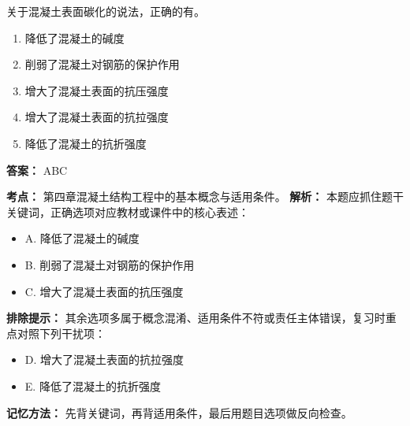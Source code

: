 \documentclass[UTF8,fontset=fandol,11pt]{ctexart}
\begin{document}
\begin{quizbox}[title={第 65 题}]
关于混凝土表面碳化的说法，正确的有。\\
\begin{enumerate}[label=\Alph*.]
\item 降低了混凝土的碱度
\item 削弱了混凝土对钢筋的保护作用
\item 增大了混凝土表面的抗压强度
\item 增大了混凝土表面的抗拉强度
\item 降低了混凝土的抗折强度
\end{enumerate}
\textbf{答案：} ABC
\vspace{0.25em}
\begin{answerbox}[title={考点解析}]
\textbf{考点：} 第四章混凝土结构工程中的基本概念与适用条件。
\textbf{解析：} 本题应抓住题干关键词，正确选项对应教材或课件中的核心表述：
\begin{itemize}
\item A. 降低了混凝土的碱度
\item B. 削弱了混凝土对钢筋的保护作用
\item C. 增大了混凝土表面的抗压强度
\end{itemize}
\textbf{排除提示：} 其余选项多属于概念混淆、适用条件不符或责任主体错误，复习时重点对照下列干扰项：
\begin{itemize}
\item D. 增大了混凝土表面的抗拉强度
\item E. 降低了混凝土的抗折强度
\end{itemize}
\textbf{记忆方法：} 先背关键词，再背适用条件，最后用题目选项做反向检查。
\end{answerbox}
\end{quizbox}
\end{document}

